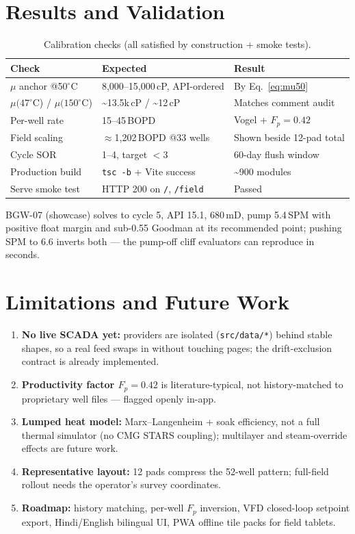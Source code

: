 \documentclass[12pt,a4paper]{report}
\begin{document}
\chapter{Results and Validation}
\begin{table}[h]
\centering
\caption{Calibration checks (all satisfied by construction + smoke tests).\label{tab:valid}}
\begin{tabular}{lp{5cm}l}
\toprule
\textbf{Check} & \textbf{Expected} & \textbf{Result} \\ \midrule
$\mu$ anchor @50$^\circ$C & 8,000--15,000\,cP, API-ordered & By Eq.~\ref{eq:mu50} \\
$\mu(47^\circ$C) / $\mu(150^\circ$C) &
\textasciitilde13.5k\,cP / \textasciitilde12\,cP & Matches comment audit \\
Per-well rate & 15--45\,BOPD & Vogel + $F_p=0.42$ \\
Field scaling & $\approx$1,202\,BOPD @33 wells & Shown beside 12-pad total \\
Cycle SOR & 1--4, target $<3$ & 60-day flush window \\
Production build & \texttt{tsc -b} + Vite success & \textasciitilde900 modules \\
Serve smoke test & HTTP 200 on \texttt{/}, \texttt{/field} & Passed \\
\bottomrule
\end{tabular}
\end{table}
BGW-07 (showcase) solves to cycle 5, API 15.1, 680\,mD, pump 5.4\,SPM with
positive float margin and sub-0.55 Goodman at its recommended point; pushing
SPM to 6.6 inverts both --- the pump-off cliff evaluators can reproduce in
seconds.

\chapter{Limitations and Future Work}
\begin{enumerate}
  \item \textbf{No live SCADA yet:} providers are isolated (\texttt{src/data/*})
    behind stable shapes, so a real feed swaps in without touching pages; the
    drift-exclusion contract is already implemented.
  \item \textbf{Productivity factor $F_p=0.42$} is literature-typical, not
    history-matched to proprietary well files --- flagged openly in-app.
  \item \textbf{Lumped heat model:} Marx--Langenheim + soak efficiency, not a
    full thermal simulator (no CMG STARS coupling); multilayer and steam-override
    effects are future work.
  \item \textbf{Representative layout:} 12 pads compress the 52-well pattern;
    full-field rollout needs the operator's survey coordinates.
  \item \textbf{Roadmap:} history matching, per-well $F_p$ inversion, VFD
    closed-loop setpoint export, Hindi/English bilingual UI, PWA offline tile
    packs for field tablets.
\end{enumerate}
\end{document}
